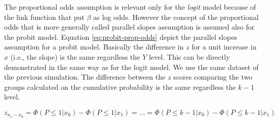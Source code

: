 \documentclass[
  man,floatsintext]{apa6}
\newenvironment{Shaded}{\begin{snugshade}}{\end{snugshade}}
\newcommand{\AttributeTok}[1]{\textcolor[rgb]{0.13,0.29,0.53}{#1}}
\newcommand{\CommentTok}[1]{\textcolor[rgb]{0.56,0.35,0.01}{\textit{#1}}}
\newcommand{\DecValTok}[1]{\textcolor[rgb]{0.00,0.00,0.81}{#1}}
\newcommand{\FunctionTok}[1]{\textcolor[rgb]{0.13,0.29,0.53}{\textbf{#1}}}
\newcommand{\NormalTok}[1]{#1}
\newcommand{\OtherTok}[1]{\textcolor[rgb]{0.56,0.35,0.01}{#1}}
\newcommand{\SpecialCharTok}[1]{\textcolor[rgb]{0.81,0.36,0.00}{\textbf{#1}}}
\newcommand{\StringTok}[1]{\textcolor[rgb]{0.31,0.60,0.02}{#1}}
\begin{document}
The proportional odds assumption is relevant only for the \emph{logit} model because of the link function that put \(\beta\) as log odds. However the concept of the proportional odds that is more generally called parallel slopes assumption is assumed also for the probit model. Equation \eqref{eq:probit-prop-odds} depict the parallel slopes assumption for a probit model. Basically the difference in \(z\) for a unit increase in \(x\) (i.e., the slope) is the same regardless the \(Y\) level. This can be directly demonstrated in the same way as for the logit model. We use the same dataset of the previous simulation. The difference between the \(z\) scores comparing the two groups calculated on the cumulative probability is the same regardless the \(k - 1\) level.

\begin{equation}
z_{x_1 - x_0} = \Phi(P \leq 1|x_0) - \Phi(P \leq 1|x_1) = \dots = \Phi(P \leq k - 1|x_0) - \Phi(P \leq k - 1|x_1)
\label{eq:probit-prop-odds}
\end{equation}

\scriptsize

\begin{Shaded}
\end{Shaded}
\end{document}
